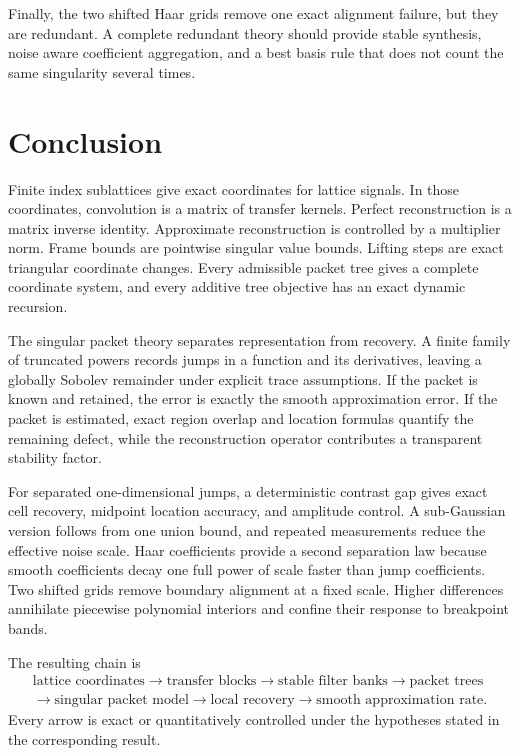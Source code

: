 \documentclass[11pt,letterpaper]{article}
\theoremstyle{plain}
\theoremstyle{plain}
\theoremstyle{plain}
\theoremstyle{definition}
\theoremstyle{definition}
\theoremstyle{definition}
\theoremstyle{definition}
\theoremstyle{remark}
\theoremstyle{remark}
\theoremstyle{remark}
\theoremstyle{remark}
\begin{document}
Finally, the two shifted Haar grids remove one exact alignment failure, but they are redundant. A complete redundant theory should provide stable synthesis, noise aware coefficient aggregation, and a best basis rule that does not count the same singularity several times.

\section{Conclusion}\label{extension:section:16}\label{sec:conclusion}

Finite index sublattices give exact coordinates for lattice signals. In those coordinates, convolution is a matrix of transfer kernels. Perfect reconstruction is a matrix inverse identity. Approximate reconstruction is controlled by a multiplier norm. Frame bounds are pointwise singular value bounds. Lifting steps are exact triangular coordinate changes. Every admissible packet tree gives a complete coordinate system, and every additive tree objective has an exact dynamic recursion.

The singular packet theory separates representation from recovery. A finite family of truncated powers records jumps in a function and its derivatives, leaving a globally Sobolev remainder under explicit trace assumptions. If the packet is known and retained, the error is exactly the smooth approximation error. If the packet is estimated, exact region overlap and location formulas quantify the remaining defect, while the reconstruction operator contributes a transparent stability factor.

For separated one-dimensional jumps, a deterministic contrast gap gives exact cell recovery, midpoint location accuracy, and amplitude control. A sub-Gaussian version follows from one union bound, and repeated measurements reduce the effective noise scale. Haar coefficients provide a second separation law because smooth coefficients decay one full power of scale faster than jump coefficients. Two shifted grids remove boundary alignment at a fixed scale. Higher differences annihilate piecewise polynomial interiors and confine their response to breakpoint bands.

The resulting chain is
\[
\begin{gathered}
\text{lattice coordinates}
\longrightarrow
\text{transfer blocks}
\longrightarrow
\text{stable filter banks}
\longrightarrow
\text{packet trees}
\\
\longrightarrow
\text{singular packet model}
\longrightarrow
\text{local recovery}
\longrightarrow
\text{smooth approximation rate}.
\end{gathered}
\]
Every arrow is exact or quantitatively controlled under the hypotheses stated in the corresponding result.
\end{document}
